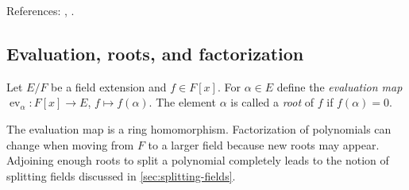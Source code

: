 References: \cite[\S9--11]{DF}, \cite[Ch.~II]{Lang}.

\subsection{Evaluation, roots, and factorization}
\begin{definition}
Let $E/F$ be a field extension and $f\in F[x]$. For $\alpha\in E$ define the \emph{evaluation map} $\operatorname{ev}_\alpha:F[x]\to E$, $f\mapsto f(\alpha)$. The element $\alpha$ is called a \emph{root} of $f$ if $f(\alpha)=0$.
\end{definition}

\begin{remark}
The evaluation map is a ring homomorphism. Factorization of polynomials can change when moving from $F$ to a larger field because new roots may appear. Adjoining enough roots to split a polynomial completely leads to the notion of splitting fields discussed in \cref{sec:splitting-fields}.
\end{remark}
